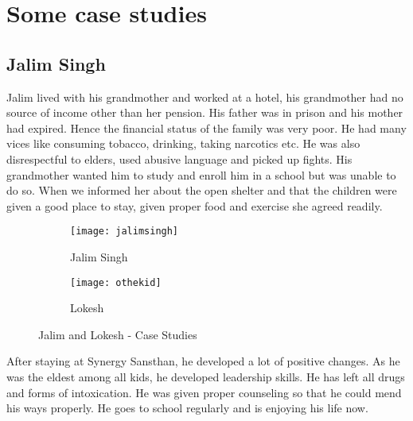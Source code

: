 \section{Some case studies}
\subsection{Jalim Singh}
Jalim lived with his grandmother and worked at a hotel, his grandmother had no source of income other than her pension. His father was in prison and his mother had expired. Hence the financial status of the family was very poor. He had many vices like consuming tobacco, drinking, taking narcotics etc. He was also disrespectful to elders, used abusive language and picked up fights. His grandmother wanted him to study and enroll him in a school but was unable to do so. When we informed her about the open shelter and that the children were given a good place to stay, given proper food and exercise she agreed readily.

\begin{figure}


	\centering
	\begin{subfigure}{.5\textwidth}
	  	\centering
	  	\texttt{[image: jalimsingh]}
	  	\caption{Jalim Singh}
	  	\label{fig:sub1}
	\end{subfigure}%
	\begin{subfigure}{.5\textwidth}
	  	\centering
	  	\texttt{[image: othekid]}
	  	\caption{Lokesh}
	  	\label{fig:sub2}
	\end{subfigure}
	\caption{Jalim and Lokesh - Case Studies}
	\label{figstart}


\end{figure}

After staying at Synergy Sansthan, he developed a lot of positive changes. As he was the eldest among all kids, he developed leadership skills. He has left all drugs and forms of intoxication. He was given proper counseling so that he could mend his ways properly. He goes to school regularly and is enjoying his life now.
